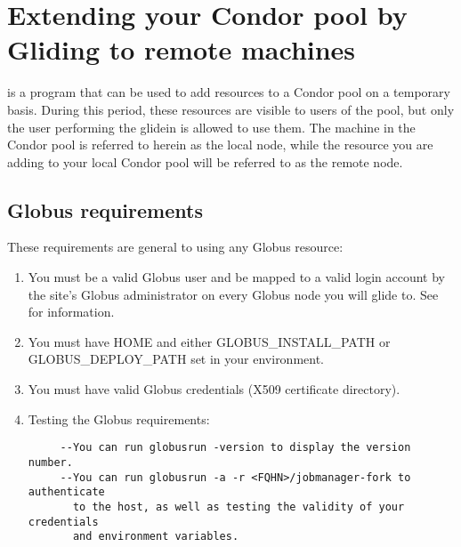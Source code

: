 \section{\label{sec:Glidein}Extending your Condor pool by Gliding to remote machines}

 is a program that can be used to add resources to a Condor 
pool on a temporary basis. During this period, these resources are visible 
to users of the pool, but only the user performing the glidein is allowed 
to use them. The machine in the Condor pool is referred to herein as the
local node, while the resource you are adding to your local Condor pool
will be referred to as the remote node.

\subsection{Globus requirements}
These requirements are general to using any Globus resource:
\begin{enumerate}

\item You must be a valid Globus user and be mapped to a valid login account by
the site's Globus administrator on every Globus node you will glide to.
See  for information.

\item You must have HOME and either {GLOBUS_INSTALL_PATH or GLOBUS_DEPLOY_PATH}
set in your environment.

\item You must have valid Globus credentials (X509 certificate directory).

\item Testing the Globus requirements:
\begin{verbatim}
     --You can run globusrun -version to display the version number.
     --You can run globusrun -a -r <FQHN>/jobmanager-fork to authenticate 
       to the host, as well as testing the validity of your credentials 
       and environment variables.
\end{verbatim}
\end{enumerate}

